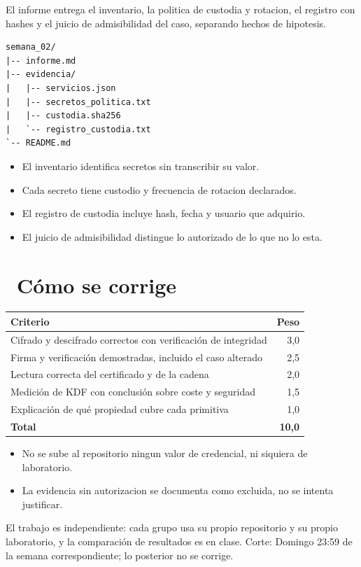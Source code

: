 \documentclass[11pt,a4paper]{article}
\newcommand{\iconotexto}[2]{\textcolor{cyanNeon}{\faIcon{#1}}~#2}
\begin{document}
El informe entrega el inventario, la politica de custodia y rotacion, el registro con hashes y el juicio de admisibilidad del caso, separando hechos de hipotesis.

\begin{lstlisting}[style=estiloCodigo]
semana_02/
|-- informe.md
|-- evidencia/
|   |-- servicios.json
|   |-- secretos_politica.txt
|   |-- custodia.sha256
|   `-- registro_custodia.txt
`-- README.md
\end{lstlisting}

\begin{itemize}[leftmargin=1.4em,itemsep=2pt,topsep=3pt]
  \item El inventario identifica secretos sin transcribir su valor.
  \item Cada secreto tiene custodio y frecuencia de rotacion declarados.
  \item El registro de custodia incluye hash, fecha y usuario que adquirio.
  \item El juicio de admisibilidad distingue lo autorizado de lo que no lo esta.
\end{itemize}

\section{\iconotexto{ruler-combined}{Cómo se corrige}}

\begin{tabularx}{\linewidth}{@{}X r@{}}
\toprule
Criterio & Peso\\
\midrule
Cifrado y descifrado correctos con verificación de integridad & 3,0 \\
Firma y verificación demostradas, incluido el caso alterado & 2,5 \\
Lectura correcta del certificado y de la cadena & 2,0 \\
Medición de KDF con conclusión sobre coste y seguridad & 1,5 \\
Explicación de qué propiedad cubre cada primitiva & 1,0 \\
\midrule
\textbf{Total} & \textbf{10,0}\\
\bottomrule
\end{tabularx}

\begin{itemize}[leftmargin=1.4em,itemsep=2pt,topsep=3pt]
  \item No se sube al repositorio ningun valor de credencial, ni siquiera de laboratorio.
  \item La evidencia sin autorizacion se documenta como excluida, no se intenta justificar.
\end{itemize}

\begin{cajaRecuerda}El trabajo es independiente: cada grupo usa su propio repositorio y su propio laboratorio, y la comparación de resultados es en clase. Corte: Domingo 23:59 de la semana correspondiente; lo posterior no se corrige.
\end{cajaRecuerda}
\end{document}
